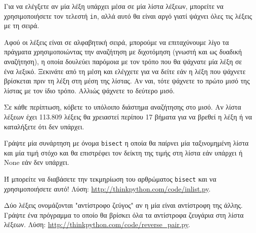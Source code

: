 \documentclass[10pt]{book}
\begin{document}
\begin{exercise}
\label{wordlist1}
\label{bisection}

Για να ελέγξετε αν μία λέξη υπάρχει μέσα σε μία λίστα λέξεων, μπορείτε να χρησιμοποιήσετε τον τελεστή {\tt in}, αλλά αυτό θα είναι αργό γιατί ψάχνει όλες τις λέξεις με τη σειρά.

Αφού οι λέξεις είναι σε αλφαβητική σειρά, μπορούμε να επιταχύνουμε λίγο τα πράγματα χρησιμοποιώντας την αναζήτηση με διχοτόμηση (γνωστή και ως δυαδική αναζήτηση), η οποία δουλεύει παρόμοια με τον τρόπο που θα ψάχνατε μία λέξη σε ένα λεξικό. Ξεκινάτε από τη μέση και ελέγχετε για να δείτε εάν η λέξη που ψάχνετε βρίσκεται πριν τη λέξη στη μέση της λίστας. Αν ναι, τότε ψάχνετε το πρώτο μισό της λίστας με τον ίδιο τρόπο. Αλλιώς ψάχνετε το δεύτερο μισό.

Σε κάθε περίπτωση, κόβετε το υπόλοιπο διάστημα αναζήτησης στο μισό. Αν λίστα λέξεων έχει 113.809 λέξεις θα χρειαστεί περίπου 17 βήματα για να βρεθεί η λέξη ή να καταλήξετε ότι δεν υπάρχει.

Γράψτε μία συνάρτηση με όνομα {\tt bisect} η οποία θα παίρνει μία ταξινομημένη λίστα και μία τιμή στόχο και θα επιστρέφει τον δείκτη της τιμής στη λίστα εάν υπάρχει ή {None} εάν δεν υπάρχει.

Ή μπορείτε να διαβάσετε την τεκμηρίωση του αρθρώματος {\tt bisect} και να χρησιμοποιήσετε αυτό! Λύση: \url{http://thinkpython.com/code/inlist.py}.
\\
\end{exercise}


\begin{exercise}

Δύο λέξεις ονομάζονται "αντίστροφο ζεύγος" αν η μία είναι αντίστροφη της άλλης. Γράψτε ένα πρόγραμμα το οποίο θα βρίσκει όλα τα αντίστροφα ζευγάρια στη λίστα λέξεων. Λύση: \url{http://thinkpython.com/code/reverse_pair.py}.
\\
\end{exercise}
\end{document}
